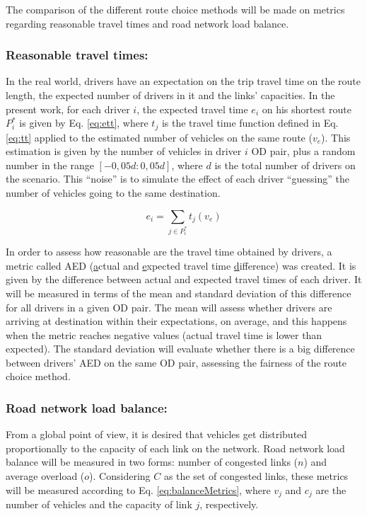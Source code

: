 \documentclass{RITA}
\newcommand{\optRoute}[1]{\ensuremath{P_#1^*}}	%
\newcommand{\travTime}{\ensuremath{t_j}} 	%
\newcommand{\linkCap}{\ensuremath{c_j}}		%
\newcommand{\veh}{\ensuremath{v}}		%
\newcommand{\ett}[1]{\ensuremath{e_#1}}		%
\newcommand{\expVeh}{\ensuremath{v_e}}		%
\begin{document}
The comparison of the different route choice methods will be made on metrics regarding reasonable travel times and road network load balance.

\subsubsection{Reasonable travel times:}
In the real world, drivers have an expectation on the trip travel time on the route length, the expected number of drivers in it and the links' capacities. In the present work, for each driver $i$, the expected travel time $\ett{i}$ on his shortest route \optRoute{i} is given by Eq. \eqref{eq:ett}, where $\travTime$ is the travel time function defined in Eq. \eqref{eq:tt} applied to the estimated number of vehicles on the same route ($\expVeh$). This estimation is given by the number of vehicles in driver $i$ OD pair, plus a random number in the range $[-0,05d:0,05d]$, where $d$ is the total number of drivers on the scenario. This ``noise'' is to simulate the effect of each driver ``guessing'' the number of vehicles going to the same destination.

\begin{equation}
\label{eq:ett}
\ett{i} = \sum_{j \in \optRoute{i}}\travTime(\expVeh)
\end{equation}

In order to assess how reasonable are the travel time obtained by drivers, a metric called AED (\underline{a}ctual and \underline{e}xpected travel time \underline{d}ifference) was created. It is given by the difference between actual and expected travel times of each driver. It will be measured in terms of the mean and standard deviation of this difference for all drivers in a given OD pair. The mean will assess whether drivers are arriving at destination within their expectations, on average, and this happens when the metric reaches negative values (actual travel time is lower than expected). The standard deviation will evaluate whether there is a big difference between drivers' AED on the same OD pair, assessing the fairness of the route choice method.

\subsubsection{Road network load balance:}

From a global point of view, it is desired that vehicles get distributed proportionally to the capacity of each link on the network. Road network load balance will be measured in two forms: number of congested links ($n$) and average overload ($o$). Considering $C$ as the set of congested links, these metrics will be measured according to Eq. \eqref{eq:balanceMetrics}, where $\veh_j$ and $\linkCap$ are the number of vehicles and the capacity of link $j$, respectively. 
\end{document}
